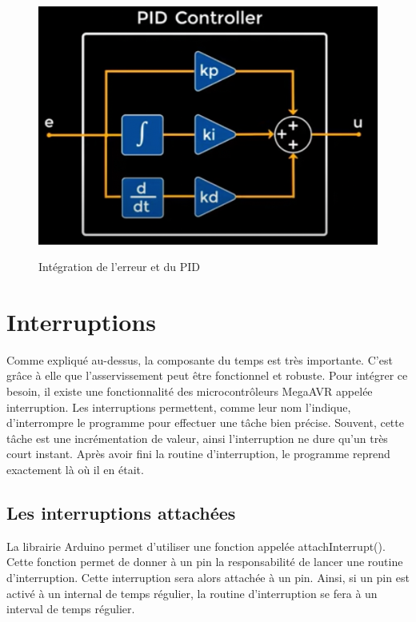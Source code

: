\documentclass[
	a4paper,									%
	11pt,										%
	twoside,									%
	openright,									%
	notitlepage,									%
	parskip=half,								%
]{scrreprt}										%
\begin{document}
	\begin{figure}[h!]
		\centering
		\includegraphics[scale=.3]{img/PID.png}
		\label{PIDfig}
		\caption{Intégration de l'erreur et du PID}
	\end{figure}
\par


\chapter{Interruptions}

Comme expliqué au-dessus, la composante du temps est très importante. C'est grâce à elle que l'asservissement peut être fonctionnel et robuste. Pour intégrer ce besoin, il existe une fonctionnalité 
des microcontrôleurs MegaAVR appelée interruption. Les interruptions permettent, comme leur nom l'indique, d'interrompre le programme pour effectuer une tâche bien précise. Souvent, cette tâche est une incrémentation de valeur, ainsi 
l'interruption ne dure qu'un très court instant. Après avoir fini la routine d'interruption, le programme reprend exactement là où il en était. \par

\section{Les interruptions attachées}

La librairie Arduino permet d'utiliser une fonction appelée attachInterrupt(). Cette fonction permet de donner à un pin la responsabilité de lancer une routine d'interruption. Cette interruption sera alors attachée à un pin. Ainsi, si un pin est activé 
à un internal de temps régulier, la routine d'interruption se fera à un interval de temps régulier. \par
\end{document}
